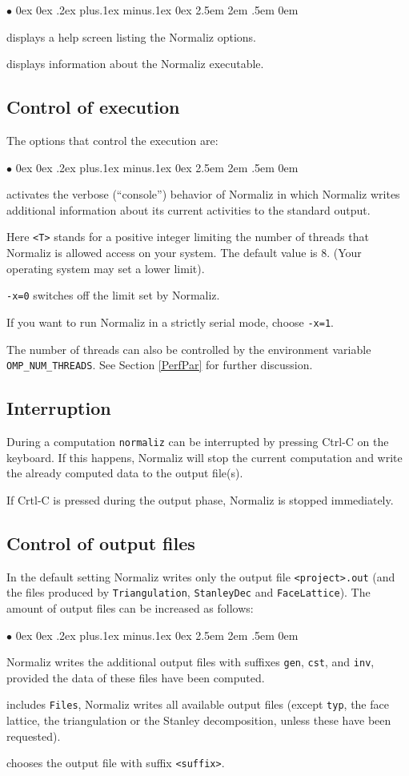 \documentclass[12pt,a4paper]{scrartcl}
\newcounter{listi}
\newcommand{\stdli}{ \topsep0ex \partopsep0ex %
\parsep.2ex plus.1ex minus.1ex \itemsep0ex%
\leftmargin2.5em \labelwidth2em \labelsep.5em \rightmargin0em}%
\renewenvironment{itemize}{\begin{list}{{$\bullet$}}{\stdli}}{\end{list}}
\theoremstyle{definition}
\def\itemtt[#1]{\item[\textbf{\ttt{#1}}]}
\def\ttt{\texttt}
\begin{document}
\begin{itemize}
	\itemtt [-{}-help, -?] displays a help screen listing the Normaliz options.
	
	\itemtt [-{}-version] displays information about the Normaliz executable.
\end{itemize}


\subsection{Control of execution}\label{exec}

The options that control the execution are:

\begin{itemize}
	\itemtt[{-}{-}verbose, -c] activates the verbose (``console'') behavior of
	Normaliz in which Normaliz writes additional
	information about its current activities to the
	standard output.
	
	\itemtt[-x=<T>] Here \ttt{<T>} stands for a positive
	integer limiting the number of threads that Normaliz
	is allowed access on your system. The default value is
	$8$. (Your operating system may set a lower limit).
	
	\ttt{-x=0} switches off the limit set by Normaliz.
	
	If you want to run
	Normaliz in a strictly serial mode, choose
	\ttt{-x=1}.
\end{itemize}

The number of threads can also be controlled by the environment
variable \verb+OMP_NUM_THREADS+. See Section \ref{PerfPar} for
further discussion.

\subsection{Interruption}\label{interrupt}

During a computation \verb|normaliz| can be interrupted by pressing Ctrl-C on the keyboard. If this happens, Normaliz will stop the current computation and write the already computed data to the output file(s).

If Crtl-C is pressed during the output phase, Normaliz is stopped immediately.

\subsection{Control of output files}\label{outcontrol}

In the default setting Normaliz writes only the output file
\ttt{<project>.out} (and the files produced by \ttt{Triangulation}, \ttt{StanleyDec} and \ttt{FaceLattice}). The
amount of output files can be
increased as follows:
\begin{itemize}
	\itemtt[{-}{-}files, -f] Normaliz writes the additional output files
	with suffixes \ttt{gen}, \ttt{cst}, and \ttt{inv},
	provided the data of these files have been computed.
	\itemtt[{-}{-}all-files, -a] includes \ttt{Files}, Normaliz writes all
	available output files (except \verb|typ|, the face lattice, the triangulation or the
	Stanley decomposition, unless these have been requested).
	\itemtt [{-}{-}<suffix>] chooses the output file with suffix \verb|<suffix>|.
\end{itemize}
\end{document}
